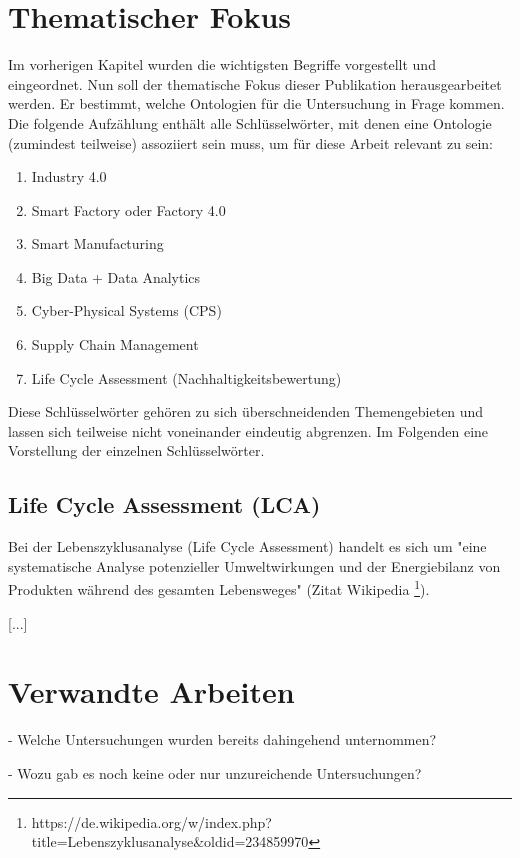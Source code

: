 \documentclass{article}
\begin{document}
\section{Thematischer Fokus}

Im vorherigen Kapitel wurden die wichtigsten Begriffe vorgestellt und eingeordnet.
Nun soll der thematische Fokus dieser Publikation herausgearbeitet werden.
Er bestimmt, welche Ontologien für die Untersuchung in Frage kommen.
Die folgende Aufzählung enthält alle Schlüsselwörter, mit denen eine Ontologie (zumindest teilweise) assoziiert sein muss, um für diese Arbeit relevant zu sein:

\begin{enumerate}
    \item Industry 4.0
    \item Smart Factory oder Factory 4.0
    \item Smart Manufacturing
    \item Big Data + Data Analytics
    \item Cyber-Physical Systems (CPS)
    \item Supply Chain Management
    \item Life Cycle Assessment (Nachhaltigkeitsbewertung)
\end{enumerate}

Diese Schlüsselwörter gehören zu sich überschneidenden Themengebieten und lassen sich teilweise nicht voneinander eindeutig abgrenzen.
Im Folgenden eine Vorstellung der einzelnen Schlüsselwörter.

\subsection{Life Cycle Assessment (LCA)}

Bei der Lebenszyklusanalyse (Life Cycle Assessment) handelt es sich um "eine systematische Analyse potenzieller Umweltwirkungen und der Energiebilanz von Produkten während des gesamten Lebensweges" (Zitat Wikipedia \footnote{https://de.wikipedia.org/w/index.php?title=Lebenszyklusanalyse\&oldid=234859970}).

[...]

\section{Verwandte Arbeiten}

- Welche Untersuchungen wurden bereits dahingehend unternommen?

- Wozu gab es noch keine oder nur unzureichende Untersuchungen?
\end{document}
